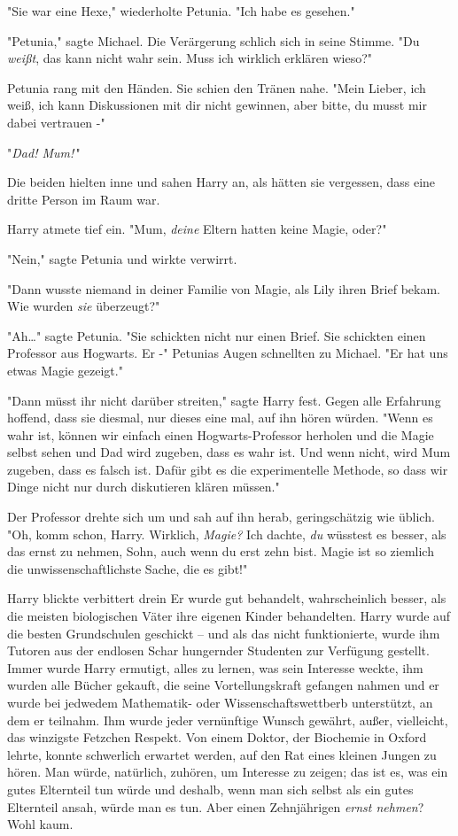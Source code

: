 {"Sie war eine Hexe," wiederholte Petunia. "Ich habe es gesehen."

"Petunia," sagte Michael. Die Verärgerung schlich sich in seine Stimme. "Du \emph{weißt}, das kann nicht wahr sein. Muss ich wirklich erklären wieso?"

Petunia rang mit den Händen. Sie schien den Tränen nahe. "Mein Lieber, ich weiß, ich kann Diskussionen mit dir nicht gewinnen, aber bitte, du musst mir dabei vertrauen -"

"\emph{Dad! Mum!}\,"

Die beiden hielten inne und sahen Harry an, als hätten sie vergessen, dass eine dritte Person im Raum war.

Harry atmete tief ein. "Mum, \emph{deine} Eltern hatten keine Magie, oder?"

"Nein," sagte Petunia und wirkte verwirrt.

"Dann wusste niemand in deiner Familie von Magie, als Lily ihren Brief bekam. Wie wurden \emph{sie} überzeugt?"

"Ah…" sagte Petunia. "Sie schickten nicht nur einen Brief. Sie schickten einen Professor aus Hogwarts. Er -" Petunias Augen schnellten zu Michael. "Er hat uns etwas Magie gezeigt."

"Dann müsst ihr nicht darüber streiten," sagte Harry fest. Gegen alle Erfahrung hoffend, dass sie diesmal, nur dieses eine mal, auf ihn hören würden. "Wenn es wahr ist, können wir einfach einen Hogwarts-Professor herholen und die Magie selbst sehen und Dad wird zugeben, dass es wahr ist. Und wenn nicht, wird Mum zugeben, dass es falsch ist. Dafür gibt es die experimentelle Methode, so dass wir Dinge nicht nur durch diskutieren klären müssen."

Der Professor drehte sich um und sah auf ihn herab, geringschätzig wie üblich. "Oh, komm schon, Harry. Wirklich, \emph{Magie?} Ich dachte, \emph{du} wüsstest es besser, als das ernst zu nehmen, Sohn, auch wenn du erst zehn bist. Magie ist so ziemlich die unwissenschaftlichste Sache, die es gibt!"

Harry blickte verbittert drein Er wurde gut behandelt, wahrscheinlich besser, als die meisten biologischen Väter ihre eigenen Kinder behandelten. Harry wurde auf die besten Grundschulen geschickt -- und als das nicht funktionierte, wurde ihm Tutoren aus der endlosen Schar hungernder Studenten zur Verfügung gestellt. Immer wurde Harry ermutigt, alles zu lernen, was sein Interesse weckte, ihm wurden alle Bücher gekauft, die seine Vortellungskraft gefangen nahmen und er wurde bei jedwedem Mathematik- oder Wissenschaftswettberb unterstützt, an dem er teilnahm. Ihm wurde jeder vernünftige Wunsch gewährt, außer, vielleicht, das winzigste Fetzchen Respekt. Von einem Doktor, der Biochemie in Oxford lehrte, konnte schwerlich erwartet werden, auf den Rat eines kleinen Jungen zu hören. Man würde, natürlich, zuhören, um Interesse zu zeigen; das ist es, was ein gutes Elternteil tun würde und deshalb, wenn man sich selbst als ein gutes Elternteil ansah, würde man es tun. Aber einen Zehnjährigen \emph{ernst nehmen}? Wohl kaum.

}
